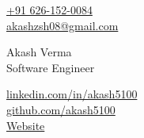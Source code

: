 \documentclass[letterpaper,11pt]{article}
\begin{document}
\setlength{\footskip}{4pt}
\begin{minipage}[b]{0.24\textwidth}
        \small \href{https://wa.me/+916261520084}{+91 626-152-0084} \\
        \small \href{mailto:akashzsh@gmail.com}{akashzsh08@gmail.com} \vspace{4pt} 
\end{minipage}%
\begin{minipage}[b]{0.5\textwidth}
        \centering
        {\Huge Akash Verma} \\ %
        \vspace{5pt}
        {\Large{Software Engineer} \vspace{5pt}}  \\
\end{minipage}%
\begin{minipage}[b]{0.26\textwidth}
        \flushright \small  %
        {\href{https://www.linkedin.com/in/link/}{linkedin.com/in/akash5100}} \\
        \href{https://github.com/akash5100}{github.com/akash5100} \\
        \href{https://akashverma.vercel.app}{Website} \\
        \vspace{4pt}
\end{minipage}  
    
\end{document}
